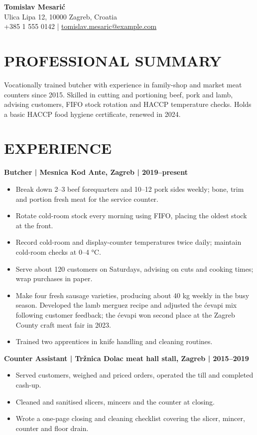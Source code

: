 \documentclass[11pt,a4paper]{article}
\begin{document}
{\LARGE\bfseries\color{primarycolor} Tomislav Mesarić}\\[0.25em]
Ulica Lipa 12, 10000 Zagreb, Croatia\\
+385 1 555 0142 | \href{mailto:tomislav.mesaric@example.com}{tomislav.mesaric@example.com}

\section*{PROFESSIONAL SUMMARY}
Vocationally trained butcher with experience in family-shop and market meat counters since 2015. Skilled in cutting and portioning beef, pork and lamb, advising customers, FIFO stock rotation and HACCP temperature checks. Holds a basic HACCP food hygiene certificate, renewed in 2024.

\section*{EXPERIENCE}
\textbf{Butcher | Mesnica Kod Ante, Zagreb | 2019–present}
\begin{itemize}
\item Break down 2–3 beef forequarters and 10–12 pork sides weekly; bone, trim and portion fresh meat for the service counter.
\item Rotate cold-room stock every morning using FIFO, placing the oldest stock at the front.
\item Record cold-room and display-counter temperatures twice daily; maintain cold-room checks at 0–4 °C.
\item Serve about 120 customers on Saturdays, advising on cuts and cooking times; wrap purchases in paper.
\item Make four fresh sausage varieties, producing about 40 kg weekly in the busy season. Developed the lamb merguez recipe and adjusted the ćevapi mix following customer feedback; the ćevapi won second place at the Zagreb County craft meat fair in 2023.
\item Trained two apprentices in knife handling and cleaning routines.
\end{itemize}
\textbf{Counter Assistant | Tržnica Dolac meat hall stall, Zagreb | 2015–2019}
\begin{itemize}
\item Served customers, weighed and priced orders, operated the till and completed cash-up.
\item Cleaned and sanitised slicers, mincers and the counter at closing.
\item Wrote a one-page closing and cleaning checklist covering the slicer, mincer, counter and floor drain.
\end{itemize}
\end{document}
